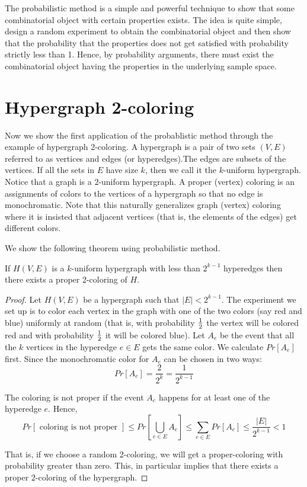 
The probabilistic method is a simple and powerful technique to show that some combinatorial object with certain properties exists. The idea is quite simple, design a random experiment to obtain the combinatorial object and then show that the probability that the properties does not get satisfied with probability strictly less than 1. Hence, by probability arguments, there must exist the combinatorial object having the properties in the underlying sample space.

\section{Hypergraph 2-coloring}

Now we show the first application of the probablistic method through the example of hypergraph 2-coloring. 
A hypergraph is a pair of two sets $(V,E)$ referred to as vertices and edges (or hyperedges).The edges are subsets of the vertices. If all the sets in $E$ have size $k$, then we call it the $k$-uniform hypergraph. Notice that a graph is a $2$-uniform hypergraph. A proper (vertex) coloring is an assignments of colors to the vertices of a hypergraph so that no edge is monochromatic. Note that this naturally generalizes graph (vertex) coloring where it is insisted that adjacent vertices (that is, the elements of the edges) get different colors.

We show the following theorem using probabilistic method.

\begin{theorem}[\bf Erd\"os~(1963)]
If $H(V,E)$ is a $k$-uniform hypergraph with less than $2^{k-1}$ hyperedges then there exists a proper 2-coloring of $H$.
\end{theorem}
\begin{proof}
Let $H(V,E)$ be a hypergraph such that $|E| < 2^{k-1}$.
The experiment we set up is to color each vertex in the graph with one of the two colors (say red and blue) uniformly at random (that is, with probability $\frac{1}{2}$ the vertex will be colored red and with probability $\frac{1}{2}$ it will be colored blue). Let $A_e$ be the event that all the $k$ vertices in the hyperedge $e \in E$ gets the same color. We calculate $Pr[A_e]$ first. Since the monochromatic color for $A_e$ can be chosen in two ways: 
$$Pr[A_e] = \frac{2}{2^k} = \frac{1}{2^{k-1}}$$

The coloring is not proper if the event $A_e$ happens for at least one of the hyperedge $e$. Hence, 
$$Pr[\textrm{ coloring is not proper }] \le Pr\left[\bigcup_{e \in E} A_e\right] \le \sum_{e \in E}Pr[A_e] \le \frac{|E|}{2^{k-1}} < 1$$

That is, if we choose a random 2-coloring, we will get a proper-coloring with probability greater than zero. This, in particular implies that there exists a proper $2$-coloring of the hypergraph.
\end{proof}

